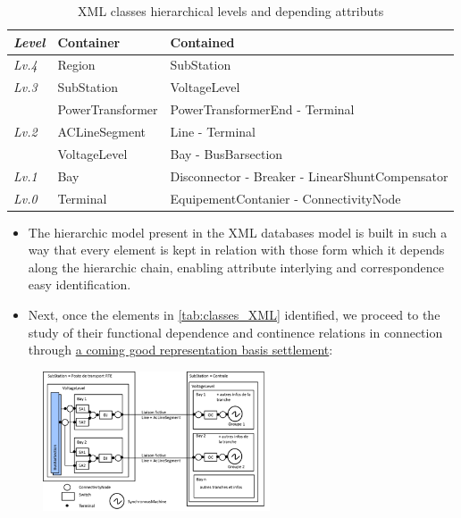 \begin{table}[h]        \centering
\label{tab:classes_dependences}
\caption{XML classes hierarchical levels and depending attributs}
\begin{tabular}{l|l|l}
\textbf{\textit{Level}} & \textbf{Container} & \textbf{Contained}\\ \midrule
\textit{Lv.4} & Region & SubStation \\ \midrule
\textit{Lv.3} & SubStation & VoltageLevel \\ \midrule
& PowerTransformer & PowerTransformerEnd - Terminal \\
\textit{Lv.2} & ACLineSegment & Line - Terminal \\ 
& VoltageLevel & Bay - BusBarsection \\ \midrule
\textit{Lv.1} & Bay & Disconnector - Breaker - LinearShuntCompensator\\ \midrule
\textit{Lv.0} & Terminal & EquipementContanier - ConnectivityNode\\
\bottomrule
\end{tabular}
\end{table}

\begin{itemize}[label={}]
    \item The hierarchic model present in the XML databases model is built in such a way that every element is kept in relation with those form which it depends along the hierarchic chain, enabling attribute interlying and correspondence easy identification.
\end{itemize}


\begin{itemize}
  \item  Next, once the elements in \autoref{tab:classes_XML} identified, we proceed to the study of their functional dependence and continence relations in connection through \hyperref[fig:post_XML_structure-Terminal]{a coming good representation basis settlement}:
  \end{itemize}
\begin{figure}[h]
    \centering
    \parbox[t]{0.6\textwidth}{
    {\centering
    \includegraphics[width=0.6\textwidth]{0.figuras/BusbarSection_dependences_fonctionelles.png}}
    \label{fig:post_XML_structure}}
\end{figure}



